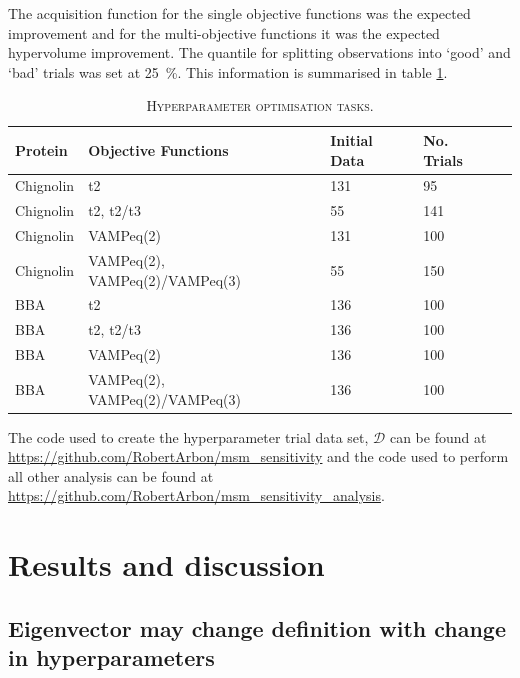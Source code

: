 \documentclass[journal=jacsat,manuscript=article]{achemso}
\begin{document}
The acquisition function for the single objective functions was the expected improvement and for the multi-objective functions it was the expected hypervolume improvement. The quantile for splitting observations into `good' and `bad' trials was set at \SI{25}{\percent}. This information is summarised in table \ref{tab:opt_description}. 

\begin{table}[h]
    \caption{\textsc{Hyperparameter optimisation tasks.}}
    \begin{tabularx}{\textwidth}{llXXX}
    \toprule
    \textbf{Protein} & \textbf{Objective Functions} & \textbf{Initial Data} & \textbf{No. Trials} \\ 
    
    \midrule
    Chignolin & t2        & 131 & 95 \\
    Chignolin & t2, t2/t3 & 55 & 141 \\
    Chignolin & VAMPeq(2) & 131 & 100 \\

    Chignolin & VAMPeq(2), VAMPeq(2)/VAMPeq(3) & 55 & 150 \\

    BBA & t2        & 136 & 100 \\
    BBA & t2, t2/t3 & 136 & 100 \\
    BBA & VAMPeq(2) & 136 & 100 \\
    BBA & VAMPeq(2), VAMPeq(2)/VAMPeq(3) & 136 & 100 \\
    \bottomrule
    \end{tabularx}
    \label{tab:opt_description}
\end{table}

The code used to create the hyperparameter trial data set, $\mathcal{D}$ can be found at \url{https://github.com/RobertArbon/msm_sensitivity} and the code used to perform all other analysis can be found at \url{https://github.com/RobertArbon/msm_sensitivity_analysis}.  




\section{Results and discussion}

\subsection{Eigenvector may change definition with change in hyperparameters}\label{sec:evs_change}
\end{document}

